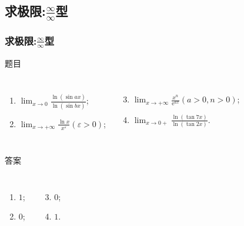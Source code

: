 \documentclass[
10pt,
aspectratio=43,
]{beamer}
\begin{document}
\subsection{求极限:$\displaystyle\frac{\infty}{\infty}$型}
\begin{frame}
	\frametitle{求极限:$\displaystyle\frac{\infty}{\infty}$型}
	\everymath{\displaystyle}
	\begin{block}{题目}
		\begin{columns}[onlytextwidth]
			\begin{enumerate}
				\item $\lim _{x \rightarrow 0} \frac{\ln (\sin a x)}{\ln (\sin b x)}$;
				\item $\lim _{x \rightarrow+\infty} \frac{\ln x}{x^{\varepsilon}}(\varepsilon>0)$;
			\end{enumerate}
			\begin{enumerate}
				\setcounter{enumi}{2}
				\item $\lim _{x \rightarrow+\infty} \frac{x^n}{\mathrm{e}^{a x}}(a>0, n>0)$;
				\item $\lim _{x \rightarrow 0+} \frac{\ln (\tan 7 x)}{\ln (\tan 2 x)}$.
			\end{enumerate}
		\end{columns}
	\end{block}

	\begin{exampleblock}{答案}
		\begin{columns}[onlytextwidth]
			\begin{enumerate}
				\pause
				\item $1$;
				\item $0$;
			\end{enumerate}
			\begin{enumerate}
				\setcounter{enumi}{2}
				\pause
				\item $0$;
				\item $1$.
			\end{enumerate}
		\end{columns}
	\end{exampleblock}
\end{frame}
\end{document}
